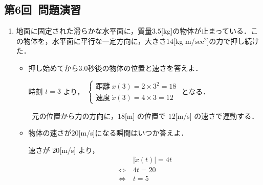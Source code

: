 \documentclass[a4paper,11pt]{ltjsarticle}
\begin{document}
\subsection{第6回\ 問題演習}

\begin{enumerate}
  \item 地面に固定された滑らかな水平面に，質量$3.5$[kg]の物体が止まっている．この物体を，水平面に平行な一定方向に，大きさ$14$[kg \cdot m/$\mathrm{sec}^{2}$]の力で押し続けた．
  \begin{itemize}
    \begin{equation*}
      \begin{aligned}
                        &\ m \ddot{x} = F \\
        \Leftrightarrow &\ 3.5 \ddot{x}(t) = 14 \\
        \Leftrightarrow &\ \dot{x}(t) = At + B \\
        \Leftrightarrow &\ x(t) = 2t^{2} + Ct + D \\
      \end{aligned}
    \end{equation*}
    初期条件より，
    $
    \begin{cases}
      x(0)=0 \\
      \dot{x}(0)=0
    \end{cases}
    $
    となる．\\
    初期条件を考慮に入れると，
    $
    \begin{cases}
      距離\ x(t)=2t^{2} \\
      速度\ \dot{x}(t)=4t
    \end{cases}
    $ となる． 

\clearpage

    \item 押し始めてから$3.0$秒後の物体の位置と速さを答えよ．

    時刻 $t=3$ より，
    $
    \begin{cases}
      距離\ x(3)=2 \times 3^{2} = 18 \\
      速度\ \dot{x}(3) = 4 \times 3 =12
    \end{cases}
    $ となる．

    \therefore\ 元の位置から力の方向に，$18$[m] の位置で $12$[m/s] の速さで運動する．


    \item 物体の速さが$20$[m/s]になる瞬間はいつか答えよ．
    
    速さが $20$[m/s] より，
    \begin{equation*}
      \begin{aligned}
                        &\ |\dot{x}(t)| = 4t \\
        \Leftrightarrow &\ 4t = 20 \\
        \Leftrightarrow &\ t = 5 \\
      \end{aligned}
    \end{equation*}


\end{itemize}
\end{enumerate}
\end{document}
